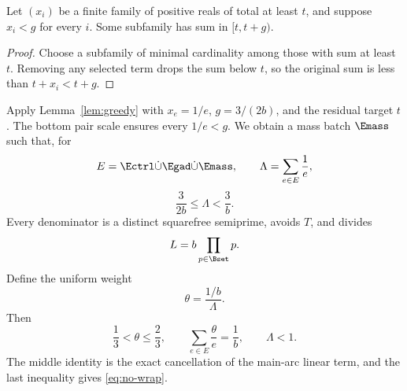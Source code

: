 \begin{lemma}\label{lem:greedy}
Let $(x_i)$ be a finite family of positive reals of total at least $t$, and
suppose $x_i<g$ for every $i$.  Some subfamily has sum in $[t,t+g)$.
\end{lemma}
\begin{proof}
Choose a subfamily of minimal cardinality among those with sum at least $t$.
Removing any selected term drops the sum below $t$, so the original sum is
less than $t+x_i<t+g$.
\end{proof}

Apply Lemma~\ref{lem:greedy} with $x_e=1/e$, $g=3/(2b)$, and the residual
target $t$.  The bottom pair scale ensures every $1/e<g$.  We obtain a mass
batch $\Emass$ such that, for
\[
 E=\Ectrl\dot\cup\Egad\dot\cup\Emass,
 \qquad
 \Lambda=\sum_{e\in E}\frac1e,
\]
\begin{equation}\label{eq:load-window}
 \frac{3}{2b}\le\Lambda<\frac3b.
\end{equation}
Every denominator is a distinct squarefree semiprime, avoids $T$, and divides
\begin{equation}\label{eq:period}
 L=b\prod_{p\in\Bset}p.
\end{equation}
Define the uniform weight
\begin{equation}\label{eq:theta}
 \theta=\frac{1/b}{\Lambda}.
\end{equation}
Then
\begin{equation}\label{eq:theta-window}
 \frac13<\theta\le\frac23,
 \qquad
 \sum_{e\in E}\frac\theta e=\frac1b,
 \qquad
 \Lambda<1.
\end{equation}
The middle identity is the exact cancellation of the main-arc linear term, and
the last inequality gives \eqref{eq:no-wrap}.

